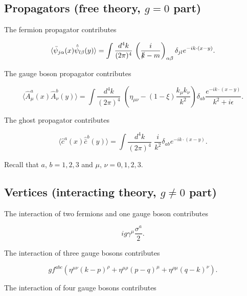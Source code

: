 \subsection*{Propagators (free theory, $g=0$ part)}

\noindent The fermion propagator contributes 

\begin{equation}
\langle \bar{\psi}_{j \alpha} (x) \hat{\bar{\psi}}_{l \beta} (y) \rangle = \int \frac{d^4 k}{(2 \pi)^4} \, \left( \frac{i}{\slashed{k} - m} \right)_{\alpha \beta} \delta_{jl} e^{-i k \cdot (x-y)}.
\end{equation}

\noindent The gauge boson propagator contributes 

\begin{equation}
\langle \hat{A}_\mu^a (x) \hat{A}_\nu^b (y) \rangle = \int \frac{d^4 k}{(2 \pi)^4} \,\, \left( \eta_{\mu\nu} - (1-\xi) \frac{k_\mu k_\nu}{k^2} \right) \delta_{ab} \frac{e^{-i k \cdot (x-y)}}{k^2 + i \epsilon}.
\end{equation}

\noindent The ghost propagator contributes 

\begin{equation}
\langle \hat{c}^a (x) \hat{\bar{c}}^b (y) \rangle = \int \frac{d^4 k}{(2 \pi)^4} \,\, \frac{i}{k^2} \delta_{ab} e^{-i k \cdot (x-y)}.
\end{equation}

\noindent Recall that $a$, $b = 1,2,3$ and $\mu$, $\nu = 0,1,2,3$.

\subsection*{Vertices (interacting theory, $g \ne 0$ part)}

\noindent The interaction of two fermions and one gauge boson contributes

\begin{equation}
i g \gamma^\mu \frac{\sigma^a}{2}.
\end{equation}

\noindent The interaction of three gauge bosons contributes

\begin{equation}
g f^{abc} \left( \eta^{\mu\nu}(k-p)^\rho + \eta^{\mu\rho} (p-q)^\mu + \eta^{\rho\mu} (q-k)^\nu \right).
\end{equation}

\noindent The interaction of four gauge bosons contributes

